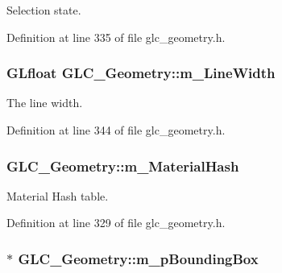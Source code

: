Selection state. 



Definition at line 335 of file glc\-\_\-geometry.\-h.

\hypertarget{class_g_l_c___geometry_a31511ef60a51db346c82971cd1132f3c}{
\subsubsection[{m\-\_\-\-Line\-Width}]{\setlength{\rightskip}{0pt plus 5cm}G\-Lfloat G\-L\-C\-\_\-\-Geometry\-::m\-\_\-\-Line\-Width\hspace{0.3cm}{\ttfamily [protected]}}}\label{class_g_l_c___geometry_a31511ef60a51db346c82971cd1132f3c}


The line width. 



Definition at line 344 of file glc\-\_\-geometry.\-h.

\hypertarget{class_g_l_c___geometry_acb2ad674efd0f3570ed46ea7b2f8c785}{
\subsubsection[{m\-\_\-\-Material\-Hash}]{ G\-L\-C\-\_\-\-Geometry\-::m\-\_\-\-Material\-Hash\hspace{0.3cm}{\ttfamily [protected]}}}\label{class_g_l_c___geometry_acb2ad674efd0f3570ed46ea7b2f8c785}


Material Hash table. 



Definition at line 329 of file glc\-\_\-geometry.\-h.

\hypertarget{class_g_l_c___geometry_ae9b89451a9b289e149291457f57cb4b1}{
\subsubsection[{m\-\_\-p\-Bounding\-Box}]{$\ast$ G\-L\-C\-\_\-\-Geometry\-::m\-\_\-p\-Bounding\-Box\hspace{0.3cm}{\ttfamily [protected]}}}\label{class_g_l_c___geometry_ae9b89451a9b289e149291457f57cb4b1}


